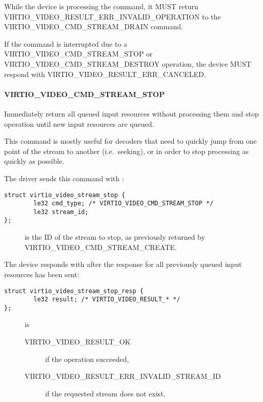 While the device is processing the command, it MUST return
VIRTIO\_VIDEO\_RESULT\_ERR\_INVALID\_OPERATION to the
VIRTIO\_VIDEO\_CMD\_STREAM\_DRAIN command.

If the command is interrupted due to a VIRTIO\_VIDEO\_CMD\_STREAM\_STOP
or VIRTIO\_VIDEO\_CMD\_STREAM\_DESTROY operation, the device MUST
respond with VIRTIO\_VIDEO\_RESULT\_ERR\_CANCELED.

\paragraph{VIRTIO_VIDEO_CMD_STREAM_STOP}\label{sec:Device Types / Video Device / Device Operation / Device Operation: Stream commands / VIRTIO_VIDEO_CMD_STREAM_STOP}

Immediately return all queued input resources without processing them
and stop operation until new input resources are queued.

This command is mostly useful for decoders that need to quickly jump
from one point of the stream to another (i.e.~seeking), or in order to
stop processing as quickly as possible.

The driver sends this command with
:

\begin{lstlisting}
struct virtio_video_stream_stop {
        le32 cmd_type; /* VIRTIO_VIDEO_CMD_STREAM_STOP */
        le32 stream_id;
};
\end{lstlisting}

\begin{description}
\item[]
is the ID of the stream to stop, as previously returned by
VIRTIO\_VIDEO\_CMD\_STREAM\_CREATE.
\end{description}

The device responds with 
after the response for all previously queued input resources has been
sent:

\begin{lstlisting}
struct virtio_video_stream_stop_resp {
        le32 result; /* VIRTIO_VIDEO_RESULT_* */
};
\end{lstlisting}

\begin{description}
\item[]
is

\begin{description}
\item[VIRTIO\_VIDEO\_RESULT\_OK]
if the operation succeeded,
\item[VIRTIO\_VIDEO\_RESULT\_ERR\_INVALID\_STREAM\_ID]
if the requested stream does not exist,
\end{description}
\end{description}

